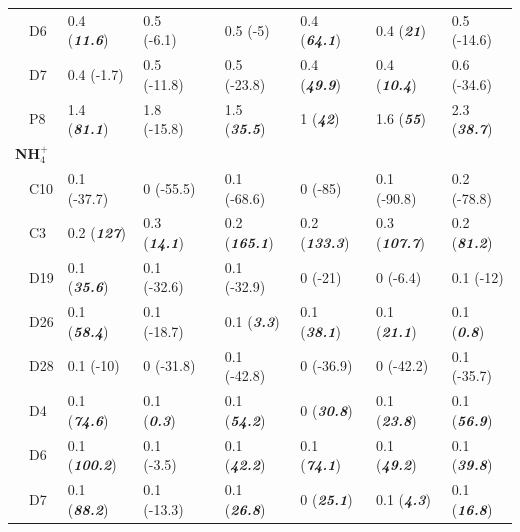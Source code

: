 \documentclass[letterpaper,12pt,oneside]{article}\usepackage[]{graphicx}\usepackage[]{color}
\begin{document}
\begin{table}[!tbp]
\begin{center}
\begin{tabular}{lllcllll}
~~D6&0.4 \footnotesize{(\textit{\textbf{11.6}})}&0.5 \footnotesize{(-6.1)}&&0.5 \footnotesize{(-5)}&0.4 \footnotesize{(\textit{\textbf{64.1}})}&0.4 \footnotesize{(\textit{\textbf{21}})}&0.5 \footnotesize{(-14.6)}\tabularnewline
~~D7&0.4 \footnotesize{(-1.7)}&0.5 \footnotesize{(-11.8)}&&0.5 \footnotesize{(-23.8)}&0.4 \footnotesize{(\textit{\textbf{49.9}})}&0.4 \footnotesize{(\textit{\textbf{10.4}})}&0.6 \footnotesize{(-34.6)}\tabularnewline
~~P8&1.4 \footnotesize{(\textit{\textbf{81.1}})}&1.8 \footnotesize{(-15.8)}&&1.5 \footnotesize{(\textit{\textbf{35.5}})}&1 \footnotesize{(\textit{\textbf{42}})}&1.6 \footnotesize{(\textit{\textbf{55}})}&2.3 \footnotesize{(\textit{\textbf{38.7}})}\tabularnewline
\hline
{\bfseries NH$_{4}^{+}$}&&&&&&&\tabularnewline
~~C10&0.1 \footnotesize{(-37.7)}&0 \footnotesize{(-55.5)}&&0.1 \footnotesize{(-68.6)}&0 \footnotesize{(-85)}&0.1 \footnotesize{(-90.8)}&0.2 \footnotesize{(-78.8)}\tabularnewline
~~C3&0.2 \footnotesize{(\textit{\textbf{127}})}&0.3 \footnotesize{(\textit{\textbf{14.1}})}&&0.2 \footnotesize{(\textit{\textbf{165.1}})}&0.2 \footnotesize{(\textit{\textbf{133.3}})}&0.3 \footnotesize{(\textit{\textbf{107.7}})}&0.2 \footnotesize{(\textit{\textbf{81.2}})}\tabularnewline
~~D19&0.1 \footnotesize{(\textit{\textbf{35.6}})}&0.1 \footnotesize{(-32.6)}&&0.1 \footnotesize{(-32.9)}&0 \footnotesize{(-21)}&0 \footnotesize{(-6.4)}&0.1 \footnotesize{(-12)}\tabularnewline
~~D26&0.1 \footnotesize{(\textit{\textbf{58.4}})}&0.1 \footnotesize{(-18.7)}&&0.1 \footnotesize{(\textit{\textbf{3.3}})}&0.1 \footnotesize{(\textit{\textbf{38.1}})}&0.1 \footnotesize{(\textit{\textbf{21.1}})}&0.1 \footnotesize{(\textit{\textbf{0.8}})}\tabularnewline
~~D28&0.1 \footnotesize{(-10)}&0 \footnotesize{(-31.8)}&&0.1 \footnotesize{(-42.8)}&0 \footnotesize{(-36.9)}&0 \footnotesize{(-42.2)}&0.1 \footnotesize{(-35.7)}\tabularnewline
~~D4&0.1 \footnotesize{(\textit{\textbf{74.6}})}&0.1 \footnotesize{(\textit{\textbf{0.3}})}&&0.1 \footnotesize{(\textit{\textbf{54.2}})}&0 \footnotesize{(\textit{\textbf{30.8}})}&0.1 \footnotesize{(\textit{\textbf{23.8}})}&0.1 \footnotesize{(\textit{\textbf{56.9}})}\tabularnewline
~~D6&0.1 \footnotesize{(\textit{\textbf{100.2}})}&0.1 \footnotesize{(-3.5)}&&0.1 \footnotesize{(\textit{\textbf{42.2}})}&0.1 \footnotesize{(\textit{\textbf{74.1}})}&0.1 \footnotesize{(\textit{\textbf{49.2}})}&0.1 \footnotesize{(\textit{\textbf{39.8}})}\tabularnewline
~~D7&0.1 \footnotesize{(\textit{\textbf{88.2}})}&0.1 \footnotesize{(-13.3)}&&0.1 \footnotesize{(\textit{\textbf{26.8}})}&0 \footnotesize{(\textit{\textbf{25.1}})}&0.1 \footnotesize{(\textit{\textbf{4.3}})}&0.1 \footnotesize{(\textit{\textbf{16.8}})}\tabularnewline

\end{tabular}
\end{center}
\end{table}
\end{document}
